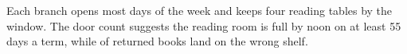 Each branch opens most days of the week and keeps four reading tables by the window.
The door count suggests the reading room is full by noon on at least 55 days a term, while  of returned books land on the wrong shelf.

